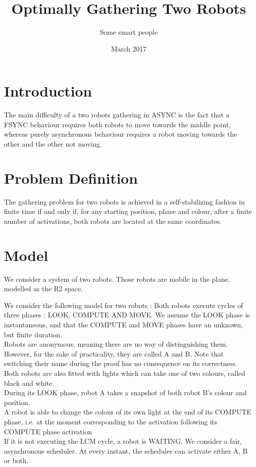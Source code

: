 \documentclass[11pt]{article}
\title{Optimally Gathering Two Robots}
\author{Some smart people}
\date{March 2017}
\begin{document}
\maketitle

\section{Introduction}

The main difficulty of a two robots gathering in ASYNC is the fact that a FSYNC behaviour requires both robots to move towards the middle point, whereas purely asynchronous behaviour requires a robot moving towards the other and the other not moving. 

\section{Problem Definition}


The gathering problem for two robots is achieved in a self-stabilizing fashion in finite time if and only if, for any starting position, phase and colour, after a finite number of activations, both robots are located at the same coordinates.

\section{Model}

We consider a system of two robots. Those robots are mobile in the plane, modelled as the R2 space.

We consider the following model for two robots : 
Both robots execute cycles of three phases : LOOK, COMPUTE AND MOVE.
We assume the LOOK phase is instantaneous, and that the COMPUTE and MOVE phases have an unknown, but finite duration.
\\
Robots are anonymous, meaning there are no way of distinguishing them. However, for the sake of practicality, they are called A and B. Note that switching their name during the proof has no consequence on its correctness.
\\
Both robots are also fitted with lights which can take one of two colours, called black and white.
\\
During its LOOK phase, robot A takes a snapshot of both robot B's colour and position.
\\
A robot is able to change the colour of its own light at the end of its COMPUTE phase, i.e. at the moment corresponding to the activation following its COMPUTE phase activation
\\
If it is not executing the LCM cycle, a robot is WAITING.
We consider a fair, asynchronous scheduler. 
At every instant, the scheduler can activate either A, B or both.
\end{document}
